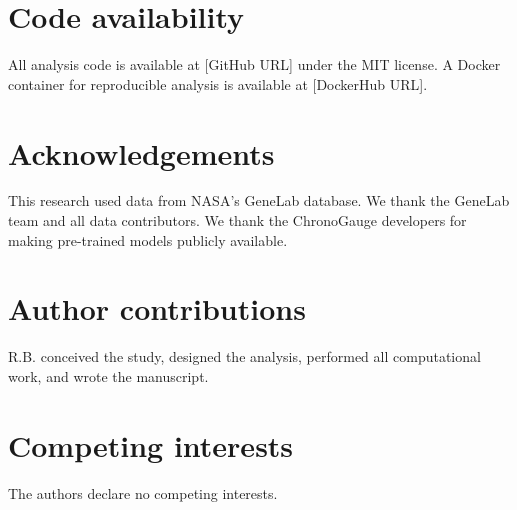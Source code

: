 \documentclass[11pt,a4paper]{article}
\begin{document}
\section*{Code availability}

All analysis code is available at [GitHub URL] under the MIT license. A Docker container for reproducible analysis is available at [DockerHub URL].

\section*{Acknowledgements}

This research used data from NASA's GeneLab database. We thank the GeneLab team and all data contributors. We thank the ChronoGauge developers for making pre-trained models publicly available.

\section*{Author contributions}

R.B. conceived the study, designed the analysis, performed all computational work, and wrote the manuscript.

\section*{Competing interests}

The authors declare no competing interests.


\end{document}
